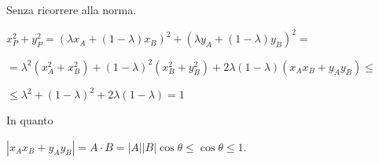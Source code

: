 \documentclass{article}
\begin{document}
\vspace{2cm}
Senza ricorrere alla norma.

$x_P^2 + y_P^2 = \left(\lambda x_A + (1-\lambda) x_B\right)^2 + \left(\lambda y_A + (1-\lambda) y_B\right)^2 =$

$=\lambda^2 (x_A^2 + x_B^2) + (1-\lambda)^2 (x_B^2+y_B^2) + 2\lambda(1-\lambda)(x_A  x_B + y_A y_B) \leq$

$\leq \lambda^2+(1-\lambda)^2 + 2\lambda(1-\lambda) = 1$


In quanto

$|x_A  x_B + y_A y_B| = A \cdot B = |A| |B| \cos\theta \leq \cos\theta \leq 1$.
\end{document}
